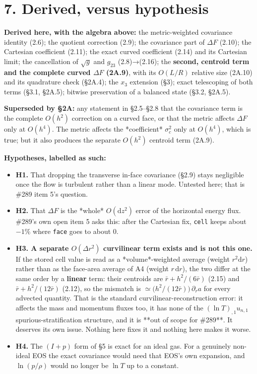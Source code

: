 \documentclass[11pt,a4paper]{article}
\begin{document}
\hrulefill

\section*{7. Derived, versus hypothesis}

\textbf{Derived here, with the algebra above:} the metric-weighted covariance identity
(2.6); the quotient correction (2.9); the covariance part of $\Delta F$ (2.10);
the Cartesian coefficient (2.11); the exact curved coefficient (2.14) and its
Cartesian limit; the cancellation of $\sqrt{g}$ and $g_{23}$ (2.8)→(2.16); the
\textbf{second, centroid term and the complete curved $\Delta F$ (2A.9)}, with its
$O(L/R)$ relative size (2A.10) and its quadrature check (§2A.4); the $x_3$
extension (§3); exact telescoping of both terms (§3.1, §2A.5); bitwise
preservation of a balanced state (§3.2, §2A.5).

\textbf{Superseded by §2A:} any statement in §2.5–§2.8 that the covariance term is the
complete $O(h^2)$ correction on a curved face, or that the metric affects
$\Delta F$ only at $O(h^4)$. The metric affects the *coefficient* $\sigma_c^2$
only at $O(h^4)$, which is true; but it also produces the separate $O(h^2)$
centroid term (2A.9).

\textbf{Hypotheses, labelled as such:}

\begin{itemize}
\item \textbf{H1.} That dropping the transverse in-face covariance (§2.9) stays negligible
  once the flow is turbulent rather than a linear mode. Untested here; that is
  \#289 item 5's question.
\item \textbf{H2.} That $\Delta F$ is the *whole* $O(\mathrm{d}z^2)$ error of the
  horizontal energy flux. \#289's own open item 5 asks this: after the Cartesian
  fix, \texttt{cell} keeps about $-1\%$ where \texttt{face} goes to about $0$.
\item \textbf{H3. A separate $O(\Delta r^2)$ curvilinear term exists and is not this one.}
  If the stored cell value is read as a *volume*-weighted average (weight
  $r^2\mathrm{d}r$) rather than as the face-area average of A4 (weight
  $r\,\mathrm{d}r$), the two differ at the same order by a \textbf{linear} term: their
  centroids are $\bar r+h^2/(6\bar r)$ (2.15) and $\bar r+h^2/(12\bar r)$ (2.12),
  so the mismatch is $\simeq\big(h^2/(12\bar r)\big)\,\partial_r a$ for every
  advected quantity. That is the standard curvilinear-reconstruction error: it
  affects the mass and momentum fluxes too, it has none of the
  $(\ln T)_{,1}u_{n,1}$ spurious-stratification structure, and it is **out of
  scope for \#289**. It deserves its own issue. Nothing here fixes it and nothing
  here makes it worse.
\item \textbf{H4.} The $(I+p)$ form of §5 is exact for an ideal gas. For a genuinely
  non-ideal EOS the exact covariance would need that EOS's own expansion, and
  $\ln(p/\rho)$ would no longer be $\ln T$ up to a constant.
\end{itemize}
\end{document}
